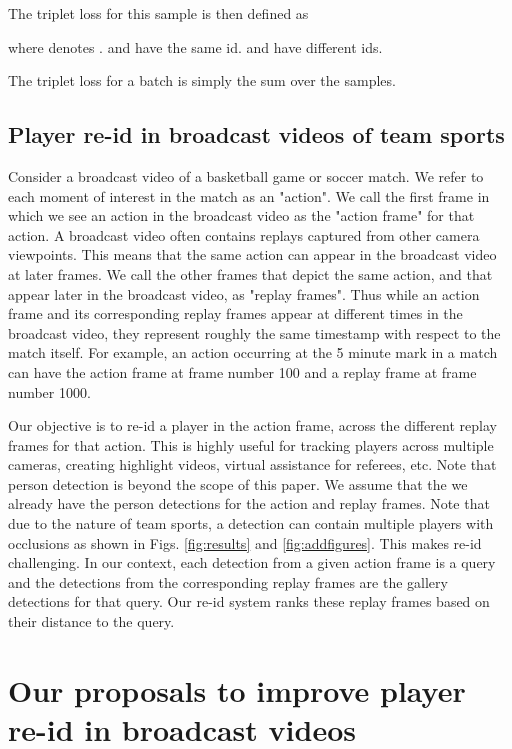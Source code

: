 \documentclass{article}
\begin{document}
The triplet loss for this sample is then defined as


where  denotes .  and  have the same id.  and  have different ids.

The triplet loss for a batch  is simply the sum over the samples.






\subsection{Player re-id in broadcast videos of team sports}
\label{sec:sports-reid}
Consider a broadcast video of a basketball game or soccer match. We refer to each moment of interest in the match as an "action". We call the first frame in which we see an action in the broadcast video as the "action frame" for that action. A broadcast video often contains replays captured from other camera viewpoints. This means that the same action can appear in the broadcast video at later frames. We call the other frames that depict the same action, and that appear later in the broadcast video, as "replay frames". Thus while an action frame and its corresponding replay frames appear at different times in the broadcast video, they represent roughly the same timestamp with respect to the match itself. For example, an action occurring at the 5 minute mark in a match can have the action frame at frame number 100 and a replay frame at frame number 1000.

Our objective is to re-id a player in the action frame, across the different replay frames for that action. This is highly useful for tracking players across multiple cameras, creating highlight videos, virtual assistance for referees, etc. Note that person detection is beyond the scope of this paper. We assume that the we already have the person detections for the action and replay frames. Note that due to the nature of team sports, a detection can contain multiple players with occlusions as shown in Figs. \ref{fig:results} and \ref{fig:addfigures}. This makes re-id challenging. In our context, each detection from a given action frame is a query and the detections from the corresponding replay frames are the gallery detections for that query. Our re-id system ranks these replay frames based on their distance to the query.

\section {Our proposals to improve player re-id in broadcast videos}
\end{document}

